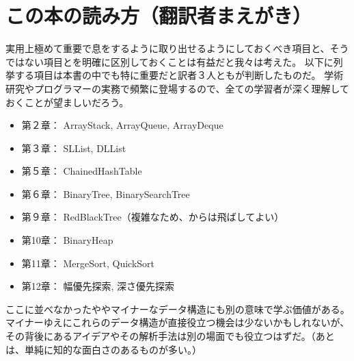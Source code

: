 \chapter*{この本の読み方（翻訳者まえがき）}

実用上極めて重要で息をするように取り出せるようにしておくべき項目と、そうではない項目とを明確に区別しておくことは有益だと我々は考えた。
以下に列挙する項目は本書の中でも特に重要だと訳者３人ともが判断したものだ。
学術研究やプログラマーの実務で頻繁に登場するので、全ての学習者が深く理解しておくことが望ましいだろう。

\begin{itemize}
  \item 第２章： ArrayStack, ArrayQueue, ArrayDeque
  \item 第３章： SLList, DLList
  \item 第５章： ChainedHashTable
  \item 第６章： BinaryTree, BinarySearchTree
  \item 第９章： RedBlackTree（複雑なため、からは飛ばしてよい）
  \item 第10章： BinaryHeap
  \item 第11章： MergeSort, QuickSort
  \item 第12章： 幅優先探索, 深さ優先探索
\end{itemize}

ここに並べなかったややマイナーなデータ構造にも別の意味で学ぶ価値がある。
マイナーゆえにこれらのデータ構造が直接役立つ機会は少ないかもしれないが、その背後にあるアイデアやその解析手法は別の場面でも役立つはずだ。（あとは、単純に知的な面白さのあるものが多い。）

